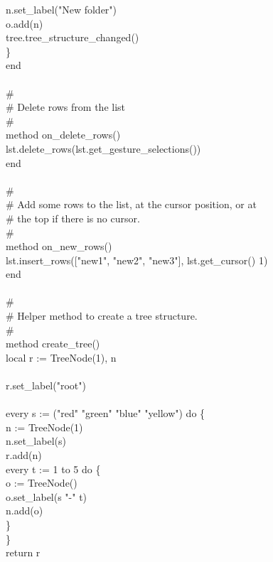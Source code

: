 {\>\>\>n.set\_label("New folder") \\
\>\>\>o.add(n) \\
\>\>\>tree.tree\_structure\_changed() \\
\>\>\>\} \\
\>end \\
\ \\
\>\# \\
\>\# Delete rows from the list \\
\>\# \\
\>method on\_delete\_rows() \\
\>\>lst.delete\_rows(lst.get\_gesture\_selections()) \\
\>end \\
\ \\
\>\# \\
\>\# Add some rows to the list, at the cursor position, or at \\
\>\# the top if there is no cursor. \\
\>\# \\
\>method on\_new\_rows() \\
\>\>lst.insert\_rows(["new1", "new2", "new3"], lst.get\_cursor() {\textbar} 1) \\
\>end \\
\ \\
\>\# \\
\>\# Helper method to create a tree structure. \\
\>\# \\
\>method create\_tree() \\
\>\>local r := TreeNode(1), n \\
\\
\>\>r.set\_label("root") \\
\ \\
\>\>every s := ("red" {\textbar} "green" {\textbar} "blue" {\textbar} "yellow") do \{ \\
\>\>\>n := TreeNode(1) \\
\>\>\>n.set\_label(s) \\
\>\>\>r.add(n) \\
\>\>\>every t := 1 to 5 do \{ \\
\>\>\>\>o := TreeNode() \\
\>\>\>\>o.set\_label(s {\textbar}{\textbar} "-" {\textbar}{\textbar}t) \\
\>\>\>\>n.add(o) \\
\>\>\>\>\} \\
\>\>\>\} \\
\>\>return r \\
}
